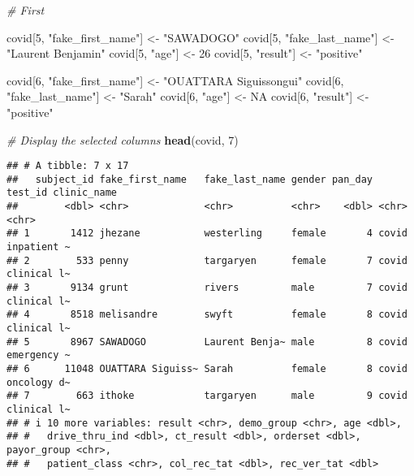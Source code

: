 \documentclass[
]{book}
\newenvironment{Shaded}{\begin{snugshade}}{\end{snugshade}}
\newcommand{\CommentTok}[1]{\textcolor[rgb]{0.56,0.35,0.01}{\textit{#1}}}
\newcommand{\ConstantTok}[1]{\textcolor[rgb]{0.56,0.35,0.01}{#1}}
\newcommand{\DecValTok}[1]{\textcolor[rgb]{0.00,0.00,0.81}{#1}}
\newcommand{\FunctionTok}[1]{\textcolor[rgb]{0.13,0.29,0.53}{\textbf{#1}}}
\newcommand{\NormalTok}[1]{#1}
\newcommand{\OtherTok}[1]{\textcolor[rgb]{0.56,0.35,0.01}{#1}}
\newcommand{\StringTok}[1]{\textcolor[rgb]{0.31,0.60,0.02}{#1}}
\begin{document}
\begin{Shaded}
\begin{Highlighting}[]
\CommentTok{\# First}

\NormalTok{covid[}\DecValTok{5}\NormalTok{, }\StringTok{"fake\_first\_name"}\NormalTok{] }\OtherTok{\textless{}{-}} \StringTok{"SAWADOGO"}
\NormalTok{covid[}\DecValTok{5}\NormalTok{, }\StringTok{"fake\_last\_name"}\NormalTok{] }\OtherTok{\textless{}{-}} \StringTok{"Laurent Benjamin"}
\NormalTok{covid[}\DecValTok{5}\NormalTok{, }\StringTok{"age"}\NormalTok{] }\OtherTok{\textless{}{-}} \DecValTok{26}
\NormalTok{covid[}\DecValTok{5}\NormalTok{, }\StringTok{"result"}\NormalTok{] }\OtherTok{\textless{}{-}} \StringTok{"positive"}


\NormalTok{covid[}\DecValTok{6}\NormalTok{, }\StringTok{"fake\_first\_name"}\NormalTok{] }\OtherTok{\textless{}{-}} \StringTok{"OUATTARA Siguissongui"}
\NormalTok{covid[}\DecValTok{6}\NormalTok{, }\StringTok{"fake\_last\_name"}\NormalTok{] }\OtherTok{\textless{}{-}} \StringTok{"Sarah"}
\NormalTok{covid[}\DecValTok{6}\NormalTok{, }\StringTok{"age"}\NormalTok{] }\OtherTok{\textless{}{-}} \ConstantTok{NA}
\NormalTok{covid[}\DecValTok{6}\NormalTok{, }\StringTok{"result"}\NormalTok{] }\OtherTok{\textless{}{-}} \StringTok{"positive"}


\CommentTok{\# Display the selected columns}
\FunctionTok{head}\NormalTok{(covid, }\DecValTok{7}\NormalTok{)}
\end{Highlighting}
\end{Shaded}

\begin{verbatim}
## # A tibble: 7 x 17
##   subject_id fake_first_name   fake_last_name gender pan_day test_id clinic_name
##        <dbl> <chr>             <chr>          <chr>    <dbl> <chr>   <chr>      
## 1       1412 jhezane           westerling     female       4 covid   inpatient ~
## 2        533 penny             targaryen      female       7 covid   clinical l~
## 3       9134 grunt             rivers         male         7 covid   clinical l~
## 4       8518 melisandre        swyft          female       8 covid   clinical l~
## 5       8967 SAWADOGO          Laurent Benja~ male         8 covid   emergency ~
## 6      11048 OUATTARA Siguiss~ Sarah          female       8 covid   oncology d~
## 7        663 ithoke            targaryen      male         9 covid   clinical l~
## # i 10 more variables: result <chr>, demo_group <chr>, age <dbl>,
## #   drive_thru_ind <dbl>, ct_result <dbl>, orderset <dbl>, payor_group <chr>,
## #   patient_class <chr>, col_rec_tat <dbl>, rec_ver_tat <dbl>
\end{verbatim}
\end{document}
